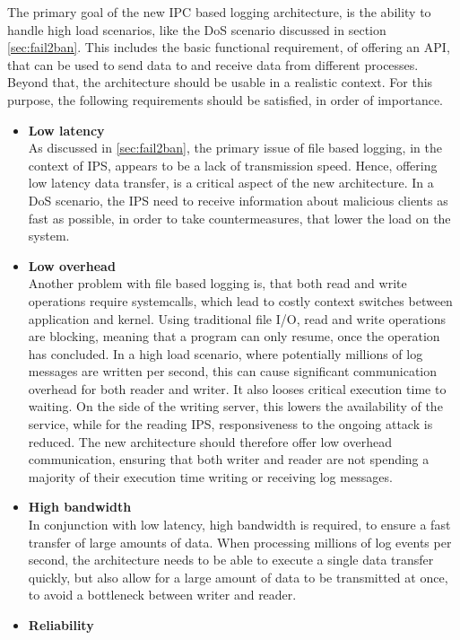 The primary goal of the new \ac{IPC} based logging architecture, is the ability to handle high load scenarios, like the \ac{DoS} scenario discussed in section \ref{sec:fail2ban}.
This includes the basic functional requirement, of offering an API, that can be used to send data to and receive data from different processes. Beyond that,
the architecture should be usable in a realistic context. For this purpose, the following requirements should be satisfied, in order of importance.
\begin{itemize}
    \item \textbf{Low latency} \\
    As discussed in \ref{sec:fail2ban},  the primary issue of file based logging, in the context of \ac{IPS}, appears to be a lack of transmission speed. Hence,
    offering low latency data transfer, is a critical aspect of the new architecture. In a \ac{DoS} scenario, the \ac{IPS} need to receive information
    about malicious clients as fast as possible, in order to take countermeasures, that lower the load on the system. 
    \item \textbf{Low overhead} \\
    Another problem with file based logging is, that both read and write operations require systemcalls, which lead to costly context switches between application and kernel. Using traditional
    file I/O, read and write operations are blocking, meaning that a program can only resume, once the operation has concluded. In a high load scenario, where potentially
    millions of log messages are written per second, this can cause significant communication overhead for both reader and writer. It also looses critical execution time to waiting.
   On the side of the writing server, this lowers the availability of the service, while for the reading \ac{IPS}, responsiveness to the ongoing attack is reduced. The new architecture should therefore offer low overhead communication,
    ensuring that both writer and reader are not spending a majority of their execution time writing or receiving log messages.
    \item \textbf{High bandwidth} \\
    In conjunction with  low latency, high bandwidth is required, to ensure a fast transfer of large amounts of data. When processing millions of log events per second, the architecture
    needs to be able to execute a single data transfer quickly, but also allow for a large amount of data to be transmitted at once, to avoid a bottleneck between writer and reader.
    \item \textbf{Reliability} \\

\end{itemize}
